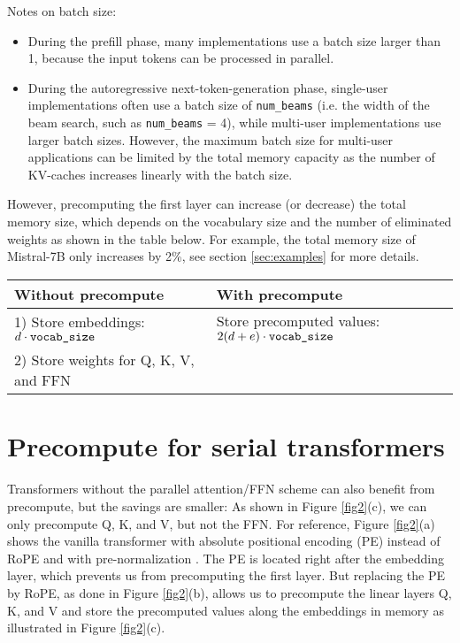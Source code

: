 \documentclass{article}
\begin{document}
Notes on batch size:
\begin{itemize}[topsep=-1pt, itemsep=-1pt]
  \item During the prefill phase, many implementations use a batch size larger than 1, because the input tokens can be processed in parallel.
  \item During the autoregressive next-token-generation phase, single-user implementations often use a batch size of \verb+num_beams+ (i.e. the width of the beam search, such as \verb+num_beams+ = 4), while multi-user implementations use larger batch sizes. However, the maximum batch size for multi-user applications can be limited by the total memory capacity as the number of KV-caches increases linearly with the batch size.
\end{itemize}

However, precomputing the first layer can increase (or decrease) the total memory size, which depends on the vocabulary size and the number of eliminated weights as shown in the table below. For example, the total memory size of Mistral-7B only increases by 2\%, see section \ref{sec:examples} for more details.

\begingroup \renewcommand{\arraystretch}{1.3} %
\begin{center} \begin{tabular}{l|l}
  \textbf{Without precompute}                      & \textbf{With precompute} \\ \hline
  1) Store embeddings: $d \cdot \verb+vocab_size+$ & Store precomputed values: $2(d+e) \cdot \verb+vocab_size+$ \\
  2) Store weights for Q, K, V, and FFN            &                          \\ \hline
\end{tabular} \end{center} \endgroup

\section{Precompute for serial transformers}
Transformers without the parallel attention/FFN scheme can also benefit from precompute, but the savings are smaller: As shown in Figure \ref{fig2}(c), we can only precompute Q, K, and V, but not the FFN. For reference, Figure \ref{fig2}(a) shows the vanilla transformer with absolute positional encoding (PE) instead of RoPE and with pre-normalization \citep{pre-norm}. The PE is located right after the embedding layer, which prevents us from precomputing the first layer. But replacing the PE by RoPE, as done in Figure \ref{fig2}(b), allows us to precompute the linear layers Q, K, and V and store the precomputed values along the embeddings in memory as illustrated in Figure \ref{fig2}(c).
\end{document}
